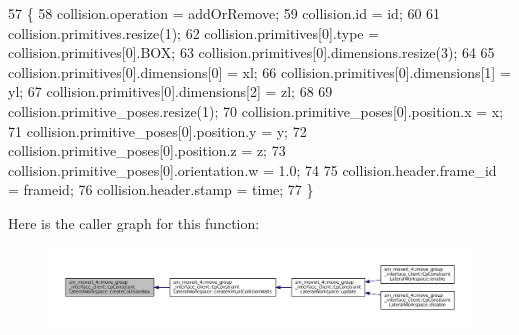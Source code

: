 \begin{DoxyCode}
57         \{
58             collision.operation = addOrRemove;
59             collision.id = id;
60 
61             collision.primitives.resize(1);
62             collision.primitives[0].type = collision.primitives[0].BOX;
63             collision.primitives[0].dimensions.resize(3);
64 
65             collision.primitives[0].dimensions[0] = xl;
66             collision.primitives[0].dimensions[1] = yl;
67             collision.primitives[0].dimensions[2] = zl;
68 
69             collision.primitive\_poses.resize(1);
70             collision.primitive\_poses[0].position.x = x;
71             collision.primitive\_poses[0].position.y = y;
72             collision.primitive\_poses[0].position.z = z;
73             collision.primitive\_poses[0].orientation.w = 1.0;
74 
75             collision.header.frame\_id = frameid;
76             collision.header.stamp = time;
77         \}
\end{DoxyCode}
Here is the caller graph for this function\+:
\nopagebreak
\begin{figure}[H]
\begin{center}
\leavevmode
\includegraphics[width=350pt]{classsm__moveit__4_1_1move__group__interface__client_1_1CpConstraintLateralWorkspace_aeeab3bc955c553843d0c23720bf78011_icgraph}
\end{center}
\end{figure}
\mbox{\label{classsm__moveit__4_1_1move__group__interface__client_1_1CpConstraintLateralWorkspace_a8c1b043abc9d74c603becad16ddcc420}} 
